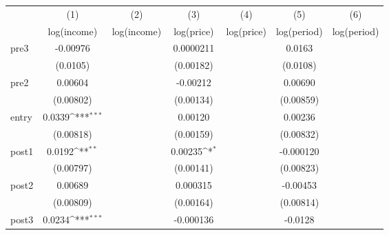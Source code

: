 {
\def\sym#1{\ifmmode^{#1}\else\(^{#1}\)\fi}
\begin{tabular}{l*{6}{c}}
\toprule
            &\multicolumn{1}{c}{(1)}&\multicolumn{1}{c}{(2)}&\multicolumn{1}{c}{(3)}&\multicolumn{1}{c}{(4)}&\multicolumn{1}{c}{(5)}&\multicolumn{1}{c}{(6)}\\
            &\multicolumn{1}{c}{log(income)}&\multicolumn{1}{c}{log(income)}&\multicolumn{1}{c}{log(price)}&\multicolumn{1}{c}{log(price)}&\multicolumn{1}{c}{log(period)}&\multicolumn{1}{c}{log(period)}\\
\midrule
pre3        &    -0.00976         &                     &   0.0000211         &                     &      0.0163         &                     \\
            &    (0.0105)         &                     &   (0.00182)         &                     &    (0.0108)         &                     \\
\addlinespace
pre2        &     0.00604         &                     &    -0.00212         &                     &     0.00690         &                     \\
            &   (0.00802)         &                     &   (0.00134)         &                     &   (0.00859)         &                     \\
\addlinespace
entry       &      0.0339\sym{***}&                     &     0.00120         &                     &     0.00236         &                     \\
            &   (0.00818)         &                     &   (0.00159)         &                     &   (0.00832)         &                     \\
\addlinespace
post1       &      0.0192\sym{**} &                     &     0.00235\sym{*}  &                     &   -0.000120         &                     \\
            &   (0.00797)         &                     &   (0.00141)         &                     &   (0.00823)         &                     \\
\addlinespace
post2       &     0.00689         &                     &    0.000315         &                     &    -0.00453         &                     \\
            &   (0.00809)         &                     &   (0.00164)         &                     &   (0.00814)         &                     \\
\addlinespace
post3       &      0.0234\sym{***}&                     &   -0.000136         &                     &     -0.0128         &                     \\

\end{tabular}}
